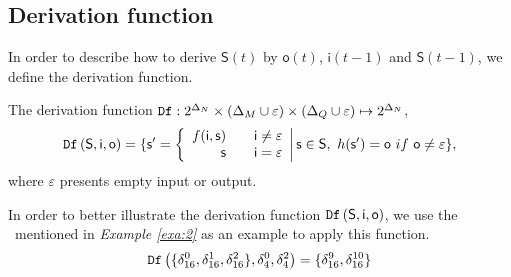 

\subsection{Derivation function}
In order to describe how to derive $\mathsf{S}(t)$ by $\mathsf{o}(t)$, $\mathsf{i}(t-1)$ and $\mathsf{S}(t-1)$, we define the derivation function. %
\begin{definition} 
The derivation function 
${\tt Df}:2^{\Delta_N}\times (\Delta_M\cup\varepsilon) \times (\Delta_Q\cup\varepsilon) \mapsto 2^{\Delta_N}$,
\[\Ded\left( \mathsf{S},  \mathsf{i},  \mathsf{o}\right)
=\{ \mathsf{s}'=\left\{
\begin{array}{rcl}
f( \mathsf{i}, \mathsf{s})      &      & {\mathsf{i}\neq \varepsilon}\\
\mathsf{s}       &      & {\mathsf{i}= \varepsilon}
\end{array} \right |\mathsf{s} \in \mathsf{S}, \ h(\mathsf{s}')=\mathsf{o}\ if\ \mathsf{o}\neq \varepsilon\},\]
where $\varepsilon$ presents empty input or output.
\end{definition}

\begin{example}
 In order to better illustrate the derivation function ${\tt Df}\left( \mathsf{S},  \mathsf{i},  \mathsf{o}\right)$, we use the \BCN\ mentioned in {\em Example \ref{exa:2}} as an example to apply this function. \[{\tt Df}\left(\{\delta_{16}^0,\delta_{16}^1,\delta_{16}^2\},\delta_4^0,\delta_4^2\right)=\{\delta_{16}^{9},\delta_{16}^{10}\}\]
 \label{exa:8}
 \end{example}   
 
